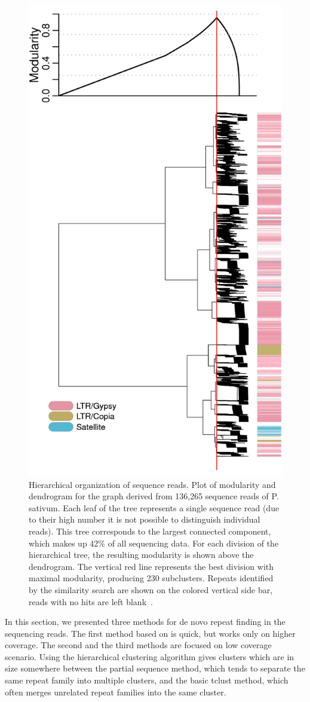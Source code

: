 \begin{figure}[htbp]
  \centering
  \includegraphics[width=.5\textwidth]{../figures/repeat-clustering}
  \caption[Hierarchical organization of sequence reads.]{Hierarchical organization of sequence reads. Plot of modularity and dendrogram for the graph derived from 136,265 sequence reads of P. sativum. Each leaf of the tree represents a single sequence read (due to their high number it is not possible to distinguish individual reads). This tree corresponds to the largest connected component, which makes up 42\% of all sequencing data. For each division of the hierarchical tree, the resulting modularity is shown above the dendrogram. The vertical red line represents the best division with maximal modularity, producing 230 subclusters. Repeats identified by the similarity search are shown on the colored vertical side bar, reads with no hits are left blank~\cite{novak2010graph}.}\label{fig:repeat-clustering}
\end{figure}

In this section, we presented three methods for de novo repeat finding in the sequencing reads. The first method based on  is quick, but works only on higher coverage. The second and the third methods are focused on low coverage scenario. Using the hierarchical clustering algorithm gives clusters which are in size somewhere between the partial sequence method, which tends to separate the same repeat family into multiple clusters, and the basic tclust method, which often merges unrelated repeat families into the same cluster.

